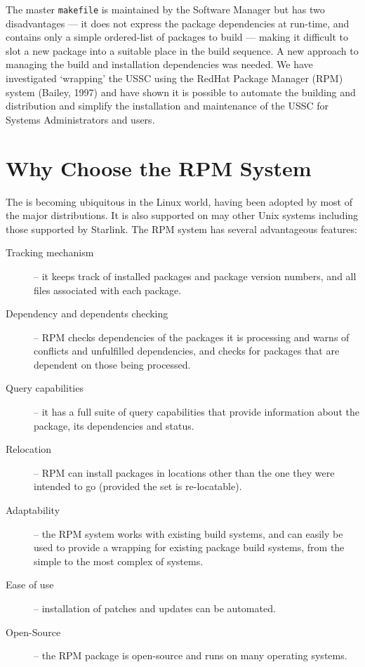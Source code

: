 The master {\tt{makefile}} is maintained by the Software Manager but
has two disadvantages --- it does not express the package dependencies at
run-time, and contains only a simple ordered-list of packages to build
--- making it difficult to slot a new package into a suitable place in
the build sequence.  A new approach to managing the build and
installation dependencies was needed.  We have investigated `wrapping'
the USSC using the RedHat Package Manager (RPM) system (Bailey, 1997) and have shown
it is possible to automate the building and distribution and simplify
the installation and maintenance of the USSC for Systems Administrators
and users.

\section{Why Choose the RPM System}

The 
is becoming ubiquitous in the Linux world, having been adopted by most
of the major distributions.  It is also supported on may other Unix
systems including those supported by Starlink.  The RPM system has
several advantageous features:

\begin{description}

\item[Tracking mechanism] -- it keeps track of installed packages and
package version numbers, and all files associated with each package.

\item[Dependency and dependents checking] -- RPM checks dependencies of
the packages it is processing and warns of conflicts and unfulfilled
dependencies, and checks for packages that are dependent on those
being processed.

\item[Query capabilities] -- it has a full suite of query capabilities
that provide information about the package, its dependencies and status.

\item[Relocation] -- RPM can install packages in locations other than the
one they were intended to go (provided the set is re-locatable).

\item[Adaptability] -- the RPM system works with existing build systems,
and can easily be used to provide a wrapping for existing package build
systems, from the simple to the most complex of systems.

\item[Ease of use] -- installation of patches and updates can be automated.

\item[Open-Source] -- the RPM package is open-source and runs on many
operating systems.

\end{description}


